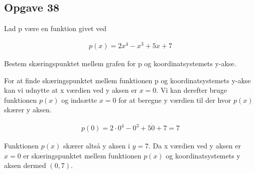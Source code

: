 \subsection{Opgave 38}

Lad p være en funktion givet ved

\begin{align*}
    p(x) = 2x^4 -x^3 + 5x + 7
\end{align*}

Bestem skæringspunktet mellem grafen for p og koordinatsystemets y-akse.

\ans

For at finde skæringspunktet mellem funktionen p og koordinatsystemets y-akse kan vi udnytte at x værdien ved y aksen er $x = 0$.
Vi kan derefter bruge funktionen $p(x)$ og indsætte $x = 0$ for at beregne y værdien til der hvor $p(x)$ skærer y aksen.

\begin{align*}
    p(0) = 2\cdot 0^4 - 0^3 + 5 \dot 0 + 7 = 7
\end{align*}

Funktionen $p(x)$ skærer altså y aksen i $y = 7$. Da x værdien ved y aksen er $x = 0$ er skæringspunktet mellem funktionen $p(x)$ og koordinatsystemets y aksen dermed
$(0, 7)$.

